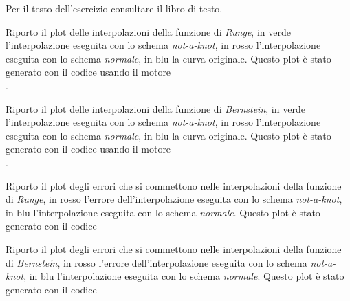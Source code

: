 % 


\begin{exercise}[4.19] 
Per il testo dell'esercizio consultare il libro di testo. 
\end{exercise}
Riporto il plot delle interpolazioni della funzione di \emph{Runge}, in verde
l'interpolazione eseguita con lo schema \emph{not-a-knot}, in rosso
l'interpolazione eseguita con lo schema \emph{normale}, in blu la curva
originale. Questo plot \`e stato generato con il codice
 usando il motore\\
.
\begin{center}   

\end{center}
Riporto il plot delle interpolazioni della funzione di \emph{Bernstein}, in
verde l'interpolazione eseguita con lo schema \emph{not-a-knot}, in rosso
l'interpolazione eseguita con lo schema \emph{normale}, in blu la curva
originale. Questo plot \`e stato generato con il codice
 usando il motore\\
.
\begin{center}   

\end{center}
Riporto il plot degli errori che si commettono nelle interpolazioni della
funzione di \emph{Runge}, in rosso l'errore dell'interpolazione eseguita con lo
schema \emph{not-a-knot}, in blu l'interpolazione eseguita con lo schema
\emph{normale}. Questo plot \`e stato generato con il codice
\begin{center}   

\end{center}
Riporto il plot degli errori che si commettono nelle interpolazioni della
funzione di \emph{Bernstein}, in rosso l'errore dell'interpolazione eseguita con
lo schema \emph{not-a-knot}, in blu l'interpolazione eseguita con lo schema
\emph{normale}. Questo plot \`e stato generato con il codice
\begin{center}   

\end{center}

